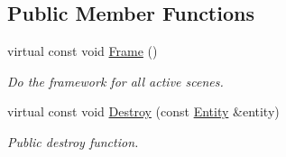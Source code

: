 \subsection*{Public Member Functions}
\begin{DoxyCompactItemize}
\item 
virtual const void \hyperlink{class_ensum_1_1_components_1_1_manager_a7327f9a28abf0011498ced0c86692a73}{Frame} ()\hypertarget{class_ensum_1_1_components_1_1_manager_a7327f9a28abf0011498ced0c86692a73}{}\label{class_ensum_1_1_components_1_1_manager_a7327f9a28abf0011498ced0c86692a73}

\begin{DoxyCompactList}\small\item\em Do the framework for all active scenes. \end{DoxyCompactList}\item 
virtual const void \hyperlink{class_ensum_1_1_components_1_1_manager_a3be559f70a5fc91769be008493948d61}{Destroy} (const \hyperlink{struct_ensum_1_1_components_1_1_entity}{Entity} \&entity)\hypertarget{class_ensum_1_1_components_1_1_manager_a3be559f70a5fc91769be008493948d61}{}\label{class_ensum_1_1_components_1_1_manager_a3be559f70a5fc91769be008493948d61}

\begin{DoxyCompactList}\small\item\em Public destroy function. \end{DoxyCompactList}\end{DoxyCompactItemize}
